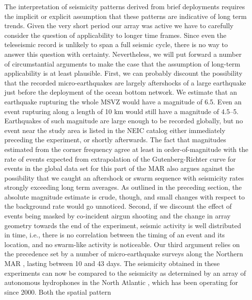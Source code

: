 \documentclass[jgr]{agu2001}
\newlength{\tw}
\begin{document}
\begin{article}
The interpretation of  seismicity patterns derived from brief deployments requires
the implicit or explicit assumption that these patterns are indicative
of long term trends.
Given the very short period our array was
active we have to carefully consider the question of applicability to longer
time frames.  Since even the teleseismic record is unlikely to
span a full seismic cycle, there is no way to answer this question with
 certainty.  Nevertheless, we will put forward a number of
circumstantial arguments to make the case that the assumption of long-term
applicability is at least plausible.   First, we can probably discount the
possibility that the recorded micro-earthquakes are largely
aftershocks of a large earthquake just before the deployment of the
ocean bottom network.  We estimate that an earthquake rupturing the whole
MSVZ would have a magnitude of
6.5.  Even an event rupturing along a length of 10 km would still have
a magnitude of 4.5--5.  Earthquakes of such magnitude are large enough
to be recorded globally, but no event near the study area is listed in
the NEIC catalog \citep{neic00}
either immediately preceding the experiment, or shortly afterwards.
The fact that magnitudes estimated from the corner frequency agree at
least in order-of-magnitude with the rate of events expected from
extrapolation of the Gutenberg-Richter curve for events in the global
data set for this part of the MAR also argues against the possibility that
we caught an aftershock or swarm sequence with
seismicity rates strongly exceeding long term averages.  As outlined
in the preceding section, the
absolute magnitude estimate is crude, though,  and  small changes with respect to the
background rate would go unnoticed.
Second, if we discount the effect of events being masked by
co-incident airgun shooting and the change in array geometry towards
the end of the experiment, seismic activity is well distributed in
time, i.e., there is no correlation between the timing of an event and
its location, and no swarm-like activity is noticeable. 
Our third argument relies on the precedence set by a number of
micro-earthquake surveys along the Northern MAR
\citep{toomey88,kong92,wolfe95,barclay01}, lasting between 10 and 43
days. The seismicity obtained in these experiments can now be compared
to the seismicity as determined by an array of autonomous hydrophones
in the North Atlantic \citep{smith03}, which has been operating for
since 2000. Both the spatial pattern

\end{article}
\end{document}
